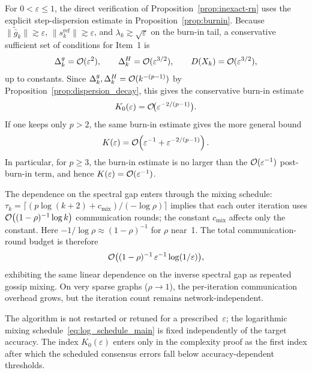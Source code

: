 \documentclass[review,onefignum,onetabnum]{siamart171218}
\begin{document}
	\begin{remark}\label{rem:burnin_order}
		For $0<\varepsilon\le1$, the direct verification of
		Proposition~\ref{prop:inexact-rn}
		uses the explicit step-dispersion estimate in
		Proposition~\ref{prop:burnin}. Because
		$\|\tilde{\bar g}_k\|\gtrsim\varepsilon$,
		$\|s_k^{\mathrm{ref}}\|\gtrsim\varepsilon$, and
		$\lambda_k\gtrsim\sqrt{\varepsilon}$ on the burn-in tail, a
		conservative sufficient set of conditions for Item~1 is
		\[
		\Delta_k^g=\mathcal{O}(\varepsilon^2),\qquad
		\Delta_k^H=\mathcal{O}(\varepsilon^{3/2}),\qquad
		D(X_k)=\mathcal{O}(\varepsilon^{3/2}),
		\]
		up to constants. Since
		$\Delta_k^g,\Delta_k^H=\mathcal{O}(k^{-(p-1)})$ by
		Proposition~\ref{prop:dispersion_decay}, this gives the
		conservative burn-in estimate
		\[
		K_0(\varepsilon)=\mathcal{O}\!\bigl(\varepsilon^{-2/(p-1)}\bigr).
		\]
		If one keeps only $p>2$, the same burn-in estimate gives the
		more general bound
		\[
		K(\varepsilon)
		=\mathcal{O}\!\left(\varepsilon^{-1}+\varepsilon^{-2/(p-1)}\right).
		\]
		In particular, for $p\ge3$, the burn-in estimate is no larger
		than the $\mathcal{O}(\varepsilon^{-1})$ post-burn-in term, and hence
		$K(\varepsilon)=\mathcal{O}(\varepsilon^{-1})$.
		
		The dependence on the spectral gap enters through the mixing schedule:
		$\tau_k=\lceil (p\log(k+2)+c_{\mathrm{mix}})/(-\log\rho)\rceil$
		implies that each
		outer iteration uses $\mathcal{O}\bigl((1-\rho)^{-1}\log k\bigr)$
		communication rounds; the constant $c_{\mathrm{mix}}$ affects only
		the constant. Here $-1/\log\rho\approx(1-\rho)^{-1}$ for $\rho$ near~1.
		The total communication-round budget is therefore
		\[
		\mathcal{O}\bigl((1-\rho)^{-1}\,\varepsilon^{-1}\log(1/\varepsilon)\bigr),
		\]
		exhibiting the same linear dependence on the inverse spectral gap
		as repeated gossip mixing.
		On very sparse graphs ($\rho\to 1$), the per-iteration communication
		overhead grows, but the iteration count remains network-independent.
	\end{remark}

	\begin{remark}\label{rem:eps-independence}
		The algorithm is not restarted or retuned for a prescribed~$\varepsilon$;
		the logarithmic mixing schedule~\eqref{eq:log_schedule_main} is fixed
		independently of the target accuracy.  The index $K_0(\varepsilon)$ enters
		only in the complexity proof as the first index after which the scheduled
		consensus errors fall below accuracy-dependent thresholds.
	\end{remark}
\end{document}
